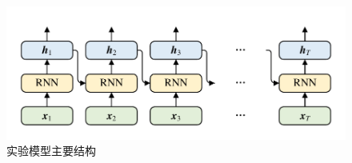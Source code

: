 \begin{figure}[htb]
	\centering
	\includegraphics[page=14, width=0.75\linewidth]{images/structure.pdf}
	\caption{实验模型主要结构}
	\label{fig:MyModel}
\end{figure}